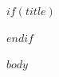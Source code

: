 \documentclass[12pt,a4paper]{article}
\begin{document}
$if(title)$
\maketitle
$endif$

$body$
\end{document}
